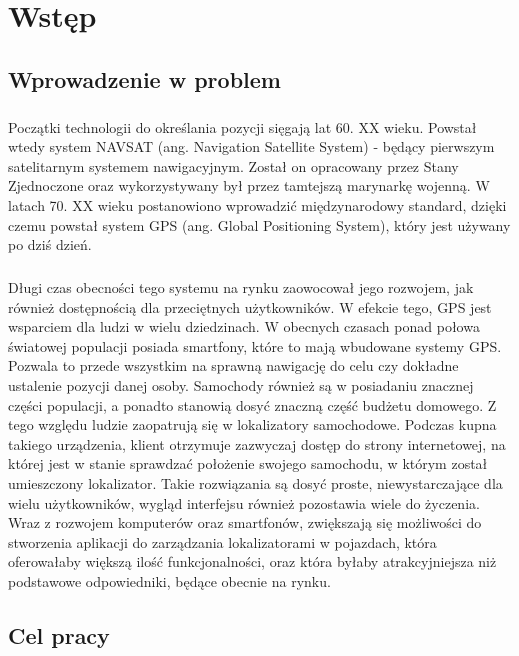 \chapter{Wstęp}
\label{ch:wstep}
\section{Wprowadzenie w problem}

\paragraph{}
Początki technologii do określania pozycji sięgają lat 60. XX wieku. Powstał wtedy system NAVSAT (ang. Navigation Satellite System) - będący pierwszym satelitarnym systemem nawigacyjnym. Został on opracowany przez Stany Zjednoczone oraz wykorzystywany był przez tamtejszą marynarkę wojenną. W latach 70. XX wieku postanowiono wprowadzić międzynarodowy standard, dzięki czemu powstał system GPS (ang. Global Positioning System), który jest używany po dziś dzień.

\paragraph{}
Długi czas obecności tego systemu na rynku zaowocował jego rozwojem, jak również dostępnością dla przeciętnych użytkowników. W efekcie tego, GPS jest wsparciem dla ludzi w wielu dziedzinach. W obecnych czasach ponad połowa światowej populacji posiada smartfony, które to mają wbudowane systemy GPS. Pozwala to przede wszystkim na sprawną nawigację do celu czy  dokładne ustalenie pozycji danej osoby. Samochody również są w posiadaniu znacznej części populacji, a ponadto stanowią dosyć znaczną część budżetu domowego. Z tego względu ludzie zaopatrują się w lokalizatory samochodowe. Podczas kupna takiego urządzenia, klient otrzymuje zazwyczaj dostęp do strony internetowej, na której jest w stanie sprawdzać położenie swojego samochodu, w którym został umieszczony lokalizator. Takie rozwiązania są dosyć proste, niewystarczające dla wielu użytkowników, wygląd interfejsu również pozostawia wiele do życzenia. Wraz z rozwojem komputerów oraz smartfonów, zwiększają się możliwości do stworzenia aplikacji do zarządzania lokalizatorami w pojazdach, która oferowałaby większą ilość funkcjonalności, oraz która byłaby atrakcyjniejsza niż podstawowe odpowiedniki, będące obecnie na rynku.

\section{Cel pracy}
